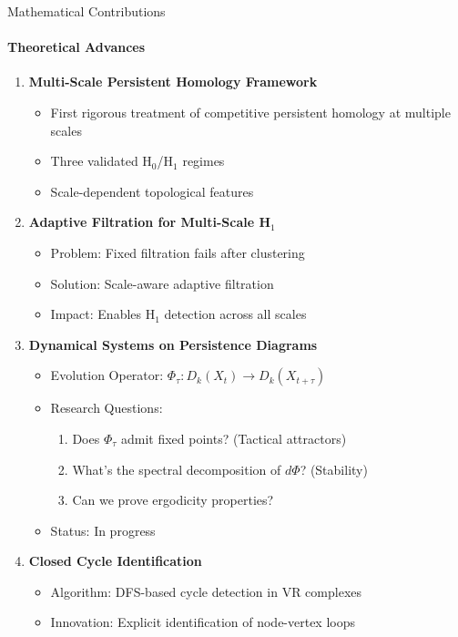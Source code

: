 \documentclass[aspectratio=169]{beamer}
\begin{document}
\begin{frame}{Mathematical Contributions}
\framesubtitle{Theoretical Advances}

\begin{enumerate}
    \item \textbf{Multi-Scale Persistent Homology Framework}
    \begin{itemize}
        \item First rigorous treatment of competitive persistent homology at multiple scales
        \item Three validated H$_0$/H$_1$ regimes
        \item Scale-dependent topological features
    \end{itemize}

    \item \textbf{Adaptive Filtration for Multi-Scale H$_1$}
    \begin{itemize}
        \item Problem: Fixed filtration fails after clustering
        \item Solution: Scale-aware adaptive filtration
        \item Impact: Enables H$_1$ detection across all scales
    \end{itemize}

    \item \textbf{Dynamical Systems on Persistence Diagrams}
    \begin{itemize}
        \item Evolution Operator: $\Phi_\tau: D_k(X_t) \to D_k(X_{t+\tau})$
        \item Research Questions:
        \begin{enumerate}
            \item Does $\Phi_\tau$ admit fixed points? (Tactical attractors)
            \item What's the spectral decomposition of $d\Phi$? (Stability)
            \item Can we prove ergodicity properties?
        \end{enumerate}
        \item Status: \textcolor{accentorange}{In progress}
    \end{itemize}

    \item \textbf{Closed Cycle Identification}
    \begin{itemize}
        \item Algorithm: DFS-based cycle detection in VR complexes
        \item Innovation: Explicit identification of node-vertex loops
    \end{itemize}
\end{enumerate}
\end{frame}
\end{document}
